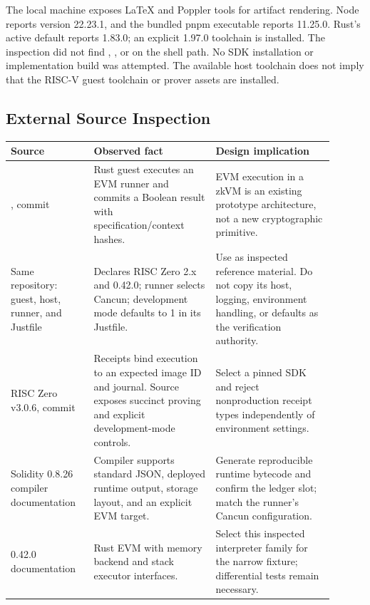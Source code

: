 \documentclass[11pt]{article}
\begin{document}
The local machine exposes LaTeX and Poppler tools for artifact rendering. Node reports version 22.23.1, and the bundled pnpm executable reports 11.25.0. Rust's active default reports 1.83.0; an explicit 1.97.0 toolchain is installed. The inspection did not find , , or  on the shell path. No SDK installation or implementation build was attempted. The available host toolchain does not imply that the RISC-V guest toolchain or prover assets are installed.

\subsection{External Source Inspection}
\begin{longtable}{L{0.23\linewidth}L{0.34\linewidth}L{0.33\linewidth}}
\toprule
\textbf{Source} & \textbf{Observed fact} & \textbf{Design implication} \\
\midrule
\endhead
{}, commit  \cite{zkpoex} & Rust guest executes an EVM runner and commits a Boolean result with specification/context hashes. & EVM execution in a zkVM is an existing prototype architecture, not a new cryptographic primitive. \\
Same repository: guest, host, runner, and Justfile \cite{upstreamguest,upstreamhost,upstreamrunner,upstreamjust} & Declares RISC Zero 2.x and  0.42.0; runner selects Cancun; development mode defaults to 1 in its Justfile. & Use as inspected reference material. Do not copy its host, logging, environment handling, or defaults as the verification authority. \\
RISC Zero v3.0.6, commit  \cite{risc0receipt,risc0prover} & Receipts bind execution to an expected image ID and journal. Source exposes succinct proving and explicit development-mode controls. & Select a pinned SDK and reject nonproduction receipt types independently of environment settings. \\
Solidity 0.8.26 compiler documentation \cite{solidity} & Compiler supports standard JSON, deployed runtime output, storage layout, and an explicit EVM target. & Generate reproducible runtime bytecode and confirm the ledger slot; match the runner's Cancun configuration. \\
 0.42.0 documentation \cite{evm} & Rust EVM with memory backend and stack executor interfaces. & Select this inspected interpreter family for the narrow fixture; differential tests remain necessary. \\
\bottomrule
\end{longtable}
\end{document}
